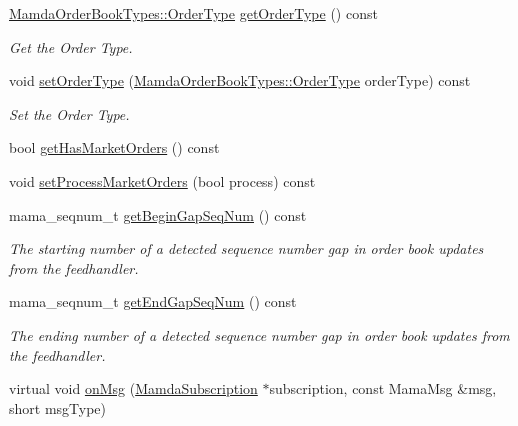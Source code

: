 \begin{CompactItemize}
\hyperlink{classWombat_1_1MamdaOrderBookTypes_b1b75d93c83c5a1042c392ab46a27291}{Mamda\-Order\-Book\-Types::Order\-Type} \hyperlink{classWombat_1_1MamdaBookAtomicListener_0c3b1f7657aed8bba468e8500dded596}{get\-Order\-Type} () const 
\begin{CompactList}\small\item\em Get the Order Type. \item\end{CompactList}\item 
void \hyperlink{classWombat_1_1MamdaBookAtomicListener_e79c2bbb2c0431a40df5788700a26c32}{set\-Order\-Type} (\hyperlink{classWombat_1_1MamdaOrderBookTypes_b1b75d93c83c5a1042c392ab46a27291}{Mamda\-Order\-Book\-Types::Order\-Type} order\-Type) const 
\begin{CompactList}\small\item\em Set the Order Type. \item\end{CompactList}\item 
bool \hyperlink{classWombat_1_1MamdaBookAtomicListener_67cf7b76360ca22ced5384aa52bf9873}{get\-Has\-Market\-Orders} () const 
\item 
void \hyperlink{classWombat_1_1MamdaBookAtomicListener_70a97f14892aaa3a9887b12ccc816651}{set\-Process\-Market\-Orders} (bool process) const 
\item 
mama\_\-seqnum\_\-t \hyperlink{classWombat_1_1MamdaBookAtomicListener_9d33a337ef8f16888f6189f704ad1412}{get\-Begin\-Gap\-Seq\-Num} () const 
\begin{CompactList}\small\item\em The starting number of a detected sequence number gap in order book updates from the feedhandler. \item\end{CompactList}\item 
mama\_\-seqnum\_\-t \hyperlink{classWombat_1_1MamdaBookAtomicListener_b965aab29205f4f229ad021094d6b16e}{get\-End\-Gap\-Seq\-Num} () const 
\begin{CompactList}\small\item\em The ending number of a detected sequence number gap in order book updates from the feedhandler. \item\end{CompactList}\item 
virtual void \hyperlink{classWombat_1_1MamdaBookAtomicListener_f8e8325226362f8accab387ebcfe4c68}{on\-Msg} (\hyperlink{classWombat_1_1MamdaSubscription}{Mamda\-Subscription} $\ast$subscription, const Mama\-Msg \&msg, short msg\-Type)
\end{CompactItemize}



